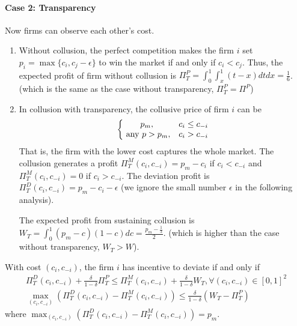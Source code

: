 \documentclass[12pt]{article}
\begin{document}
\paragraph{Case 2: Transparency} Now firms can observe each other's cost.
\begin{enumerate}
    \item Without collusion, the perfect competition makes the firm $i$ set $p_i=\max\{c_i,c_j-\epsilon\}$ to win the market if and only if $c_i< c_j$. Thus, the expected profit of firm without collusion is $\Pi^P_T=\int_0^1 \int_x^1 (t-x) dt dx=\frac{1}{6}$. (which is the same as the case without transparency, $\Pi^P_T=\Pi^P$)
    \item In collusion with transparency, the collusive price of firm $i$ can be $$\left\{\begin{matrix}
        p_m,&c_i\leq c_{-i}\\
        \textnormal{ any }p>p_m,&c_i>c_{-i}
    \end{matrix}\right.$$ That is, the firm with the lower cost captures the whole market. The collusion generates a profit $\Pi^M_T(c_i,c_{-i})=p_m-c_i$ if $c_i< c_{-i}$ and $\Pi^M_T(c_i,c_{-i})=0$ if $c_i>c_{-i}$. The deviation profit is $\Pi^D_T(c_i,c_{-i})=p_m-c_i-\epsilon$ (we ignore the small number $\epsilon$ in the following analysis).
    
    The expected profit from sustaining collusion is $W_T=\int_0^1 (p_m-c)(1-c)dc=\frac{p_m-\frac{1}{3}}{2}$. (which is higher than the case without transparency, $W_T>W$).
\end{enumerate}

With cost $(c_i,c_{-i})$, the firm $i$ has incentive to deviate if and only if
\begin{equation}
    \begin{aligned}
        \Pi^D_T(c_i,c_{-i})+\frac{\delta}{1-\delta}\Pi^P_T\leq \Pi^M_T(c_i,c_{-i})+\frac{\delta}{1-\delta}W_T,\forall (c_i,c_{-i})\in[0,1]^2\\
        \max_{(c_i,c_{-i})}\left(\Pi^D_T(c_i,c_{-i})-\Pi^M_T(c_i,c_{-i})\right)\leq \frac{\delta}{1-\delta}\left(W_T-\Pi^P_T\right)
    \end{aligned}
    \nonumber
\end{equation}
where $\max_{(c_i,c_{-i})}\left(\Pi^D_T(c_i,c_{-i})-\Pi^M_T(c_i,c_{-i})\right)=p_m$.
\end{document}
